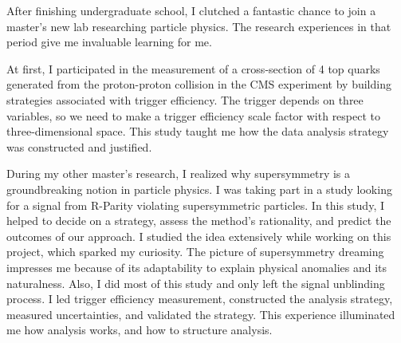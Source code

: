 
After finishing undergraduate school, I clutched a fantastic chance to join a master's new lab researching particle physics. The research experiences in that period give me invaluable learning for me.

At first, I participated in the measurement of a cross-section of 4 top quarks generated from the proton-proton collision in the CMS experiment by building strategies associated with trigger efficiency. The trigger depends on three variables, so we need to make a trigger efficiency scale factor with respect to three-dimensional space. This study taught me how the data analysis strategy was constructed and justified.

During my other master's research, I realized why supersymmetry is a groundbreaking notion in particle physics. I was taking part in a study looking for a signal from R-Parity violating supersymmetric particles. In this study, I helped to decide on a strategy, assess the method's rationality, and predict the outcomes of our approach. I studied the idea extensively while working on this project, which sparked my curiosity. The picture of supersymmetry dreaming impresses me because of its adaptability to explain physical anomalies and its naturalness. Also, I did most of this study and only left the signal unblinding process. I led trigger efficiency measurement, constructed the analysis strategy, measured uncertainties, and validated the strategy. This experience illuminated me how analysis works, and how to structure analysis. 
